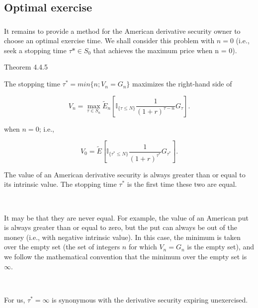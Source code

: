 \documentclass[c, dvipsnames, 8pt]{beamer}
\begin{document}
\subsection{Optimal exercise}

\begin{frame}[shrink=5]
\frametitle{\insertsection} 
\framesubtitle{\insertsubsection} 

It remains to provide a method for the American derivative security owner
to choose an optimal exercise time. We shall consider this problem with $n = 0$ 
(i.e., seek a stopping time $\tau* \in S_0$  that achieves the maximum price  when
n = 0).

\begin{block}{Theorem 4.4.5}


The stopping time $\tau^*=min\{n;V_n = G_n\} $  maximizes the right-hand side of 

\begin{equation}\label{eq1}
V_n = \max_{\tau \in S_n} \tilde{E}_n [\mathbb{I}_{\{\tau \leq N\}} \dfrac{1}{(1+r)^{\tau-n}}G_{\tau}].
\end{equation}

when $n=0$; i.e.,

\begin{equation}\label{eq1}
V_0 =  \tilde{E} [\mathbb{I}_{\{\tau^* \leq N\}} \dfrac{1}{(1+r)^{\tau^*}}G_{\tau^*}].
\end{equation}

	
\end{block}

The value of an American derivative security is always greater than or
equal to its intrinsic value. The stopping time $\tau^*$  is the first time
these two are equal. 

\

It may be that they are never equal. For example, the
value of an American put is always greater than or equal to zero, but the put
can always be out of the money (i.e., with negative intrinsic value). In this
case, the minimum is taken over the empty set (the set of integers $n$ for
which $V_n = G_n$ is the empty set), and we follow the mathematical convention
that the minimum over the empty set is $\infty$. 

\

For us, $\tau^* = \infty$ is synonymous
with the derivative security expiring unexercised.


\end{frame}	
\end{document}
